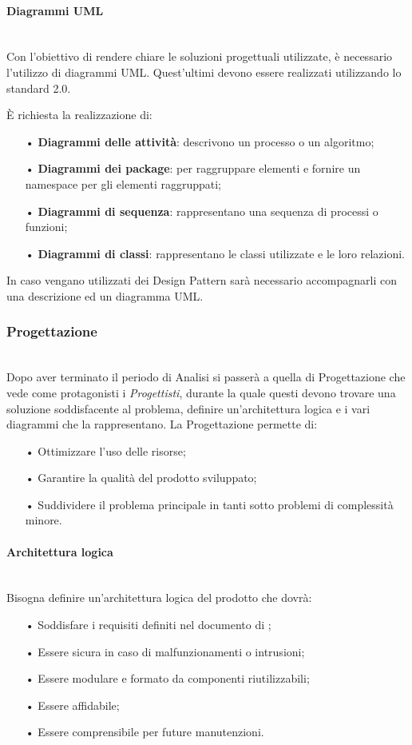 \paragraph{Diagrammi UML}\mbox{}\\
Con l'obiettivo di rendere chiare le soluzioni progettuali utilizzate, è necessario l'utilizzo di {diagrammi UML}. Quest'ultimi devono essere realizzati utilizzando lo {standard} 2.0.

È richiesta la realizzazione di:
\begin{itemize}
	\item[•] \textbf{Diagrammi delle attività}: descrivono un processo o un algoritmo;
	\item[•] \textbf{Diagrammi dei package}: per raggruppare elementi e fornire un {namespace} per gli elementi raggruppati;
	\item[•] \textbf{Diagrammi di sequenza}: rappresentano una sequenza di processi o funzioni;
	\item[•] \textbf{Diagrammi di classi}: rappresentano le classi utilizzate e le loro relazioni.
\end{itemize}
In caso vengano utilizzati dei {Design Pattern} sarà necessario accompagnarli con una descrizione ed un diagramma UML.

\subsubsection{Progettazione}\mbox{}\\
Dopo aver terminato il periodo di Analisi si passerà a quella di Progettazione che vede come protagonisti i 
\textit{Progettisti}, durante la quale questi devono trovare una soluzione soddisfacente al problema, 
definire un'{architettura} logica e i vari diagrammi che la rappresentano.
La Progettazione permette di: 
\begin{itemize}
\item[•] Ottimizzare l'uso delle risorse;
\item[•] Garantire la qualità del prodotto sviluppato;
\item[•] Suddividere il problema principale in tanti sotto problemi di complessità minore.
\end{itemize}

\paragraph{Architettura logica}\mbox{}\\
Bisogna definire un'architettura logica del prodotto che dovrà: 
\begin{itemize}
\item[•] Soddisfare i requisiti definiti nel documento di \AdR;
\item[•] Essere sicura in caso di malfunzionamenti o intrusioni;
\item[•] Essere {modulare} e formato da componenti riutilizzabili;
\item[•] Essere affidabile;
\item[•] Essere comprensibile per future manutenzioni.
\end{itemize}

